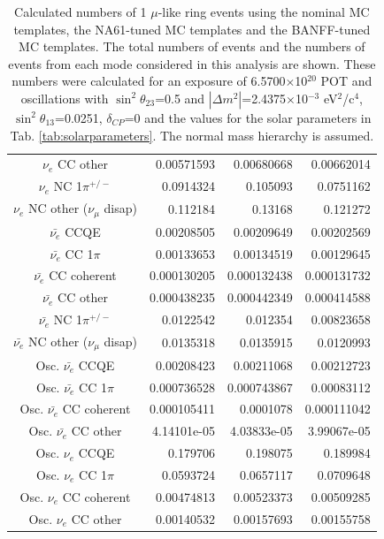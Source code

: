 \begin{table}
\begin{tabular}{| c |  D{.}{.}{-1} |  D{.}{.}{-1} |  D{.}{.}{-1} | }
$\nu_e$ CC other & 0.00571593 & 0.00680668 & 0.00662014 \\ 
$\nu_e$ NC 1$\pi^{+/-}$ & 0.0914324 & 0.105093 & 0.0751162 \\ 
$\nu_e$ NC other ($\nu_\mu$ disap) & 0.112184 & 0.13168 & 0.121272 \\ 
$\bar{\nu_e}$ CCQE & 0.00208505 & 0.00209649 & 0.00202569 \\ 
$\bar{\nu_e}$ CC 1$\pi$ & 0.00133653 & 0.00134519 & 0.00129645 \\ 
$\bar{\nu_e}$ CC coherent & 0.000130205 & 0.000132438 & 0.000131732 \\ 
$\bar{\nu_e}$ CC other & 0.000438235 & 0.000442349 & 0.000414588 \\ 
$\bar{\nu_e}$ NC 1$\pi^{+/-}$ & 0.0122542 & 0.012354 & 0.00823658 \\ 
$\bar{\nu_e}$ NC other ($\nu_\mu$ disap) & 0.0135318 & 0.0135915 & 0.0120993 \\ 
Osc. $\bar{\nu_e}$ CCQE & 0.00208423 & 0.00211068 & 0.00212723 \\ 
Osc. $\bar{\nu_e}$ CC 1$\pi$ & 0.000736528 & 0.000743867 & 0.00083112 \\ 
Osc. $\bar{\nu_e}$ CC coherent & 0.000105411 & 0.0001078 & 0.000111042 \\ 
Osc. $\bar{\nu_e}$ CC other & 4.14101e-05 & 4.03833e-05 & 3.99067e-05 \\ 
Osc. $\nu_e$ CCQE & 0.179706 & 0.198075 & 0.189984 \\ 
Osc. $\nu_e$ CC 1$\pi$ & 0.0593724 & 0.0657117 & 0.0709648 \\ 
Osc. $\nu_e$ CC coherent & 0.00474813 & 0.00523373 & 0.00509285 \\ 
Osc. $\nu_e$ CC other & 0.00140532 & 0.00157693 & 0.00155758 \\ 
\hline
\end{tabular}
\caption{
Calculated numbers of 1 $\mu$-like ring events using the nominal MC templates, the NA61-tuned MC templates
and the BANFF-tuned MC templates.
The total numbers of events and the numbers of events from each mode considered in this analysis are shown.
These numbers were calculated for an exposure of 6.5700$\times$10$^{20}$ POT
and oscillations with $\sin^{2}\theta_{23}$=0.5 and $|\Delta m^{2}|$=2.4375$\times$10$^{-3}$ eV$^{2}$/c$^{4}$,
$\sin^{2}\theta_{13}$=0.0251, $\delta_{CP}$=0 and the values for the solar parameters in Tab. \ref{tab:solarparameters}.
The normal mass hierarchy is assumed.
}
\label{tab:nsk_nominal_osc_1Rmu}
\end{table}
